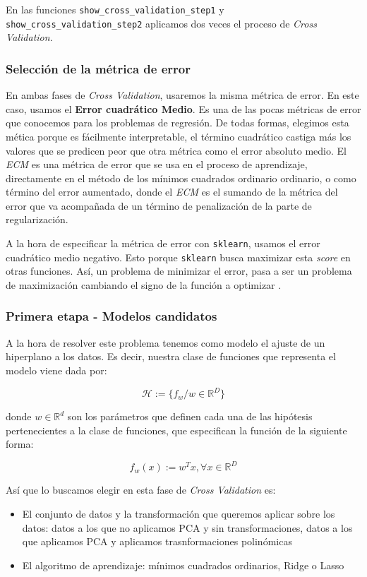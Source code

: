 \documentclass[11pt]{article}
\begin{document}
En las funciones \lstinline{show_cross_validation_step1} y \lstinline{show_cross_validation_step2} aplicamos dos veces el proceso de \emph{Cross Validation}.

\subsubsection{Selección de la métrica de error}

En ambas fases de \emph{Cross Validation}, usaremos la misma métrica de error. En este caso, usamos el \textbf{Error cuadrático Medio}. Es una de las pocas métricas de error que conocemos para los problemas de regresión. De todas formas, elegimos esta mética porque es fácilmente interpretable, el término cuadrático castiga más los valores que se predicen peor que otra métrica como el error absoluto medio. El \emph{ECM} es una métrica de error que se usa en el proceso de aprendizaje, directamente en el método de los mínimos cuadrados ordinario ordinario, o como término del error aumentado, donde el \emph{ECM} es el sumando de la métrica del error que va acompañada de un término de penalización de la parte de regularización.

A la hora de especificar la métrica de error con \lstinline{sklearn}, usamos el error cuadrático medio negativo. Esto porque \lstinline{sklearn} busca maximizar esta \emph{score} en otras funciones. Así, un problema de minimizar el error, pasa a ser un problema de maximización cambiando el signo de la función a optimizar \cite{sklearn_neg_err:online}.

\subsubsection{Primera etapa - Modelos candidatos}

A la hora de resolver este problema tenemos como modelo el ajuste de un hiperplano a los datos. Es decir, nuestra clase de funciones que representa el modelo viene dada por:

$$\mathcal{H} := \{f_w / w \in \mathbb{R}^D\}$$

donde $w \in \mathbb{R}^d$ son los parámetros que definen cada una de las hipótesis pertenecientes a la clase de funciones, que especifican la función de la siguiente forma:

$$f_w(x):= w^T x, \forall x \in \mathbb{R}^D$$

Así que lo buscamos elegir en esta fase de \emph{Cross Validation} es:

\begin{itemize}
    \item El conjunto de datos y la transformación que queremos aplicar sobre los datos: datos a los que no aplicamos PCA y sin transformaciones, datos a los que aplicamos PCA y aplicamos trasnformaciones polinómicas
    \item El algoritmo de aprendizaje: mínimos cuadrados ordinarios, Ridge o Lasso
\end{itemize}
\end{document}
